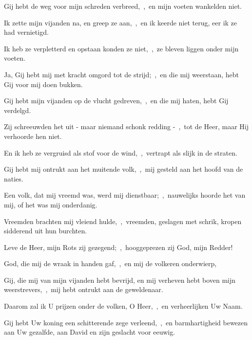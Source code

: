 \documentclass[12pt,twoside,a5paper]{article}
\begin{document}
\begin{halfparskip}
  Gij hebt de weg voor mijn schreden verbreed,~\sep\ en mijn voeten wankelden niet.

  Ik zette mijn vijanden na, en greep ze aan,~\sep\ en ik keerde niet terug, eer ik ze had vernietigd.

  Ik heb ze verpletterd en opstaan konden ze niet,~\sep\ ze bleven liggen onder mijn voeten.

  Ja, Gij hebt mij met kracht omgord tot de strijd;~\sep\ en die mij weerstaan, hebt Gij voor mij doen bukken.

  Gij hebt mijn vijanden op de vlucht gedreven,~\sep\ en die mij haten, hebt Gij verdelgd.

  Zij schreeuwden het uit - maar niemand schonk redding -~\sep\ tot de Heer, maar Hij verhoorde hen niet.

  En ik heb ze vergruisd als stof voor de wind,~\sep\ vertrapt als slijk in de straten.

  Gij hebt mij ontrukt aan het muitende volk,~\sep\ mij gesteld aan het hoofd van de naties.

  Een volk, dat mij vreemd was, werd mij dienstbaar;~\sep\ nauwelijks hoorde het van mij, of het was mij onderdanig.

  Vreemden brachten mij vleiend hulde,~\sep\ vreemden, geslagen met schrik, kropen sidderend uit hun burchten.

  Leve de Heer, mijn Rots zij gezegend;~\sep\ hooggeprezen zij God, mijn Redder!

  God, die mij de wraak in handen gaf,~\sep\ en mij de volkeren onderwierp,

  Gij, die mij van mijn vijanden hebt bevrijd, en mij verheven hebt boven mijn weerstrevers,~\sep\ mij hebt ontrukt aan de geweldenaar.

  Daarom zal ik U prijzen onder de volken, O Heer,~\sep\ en verheerlijken Uw Naam.

  Gij hebt Uw koning een schitterende zege verleend,~\sep\ en barmhartigheid bewezen aan Uw gezalfde, aan David en zijn geslacht voor eeuwig.
\end{halfparskip}
\end{document}
